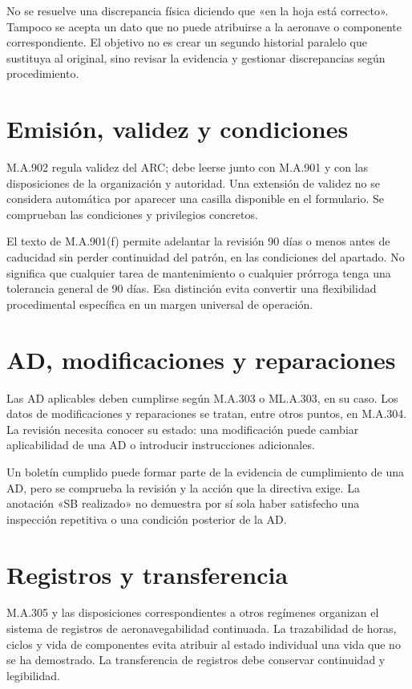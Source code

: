 No se resuelve una discrepancia física diciendo que «en la hoja está correcto». Tampoco se acepta un dato que no puede atribuirse a la aeronave o componente correspondiente. El objetivo no es crear un segundo historial paralelo que sustituya al original, sino revisar la evidencia y gestionar discrepancias según procedimiento.
\section{Emisión, validez y condiciones}
M.A.902 regula validez del ARC; debe leerse junto con M.A.901 y con las disposiciones de la organización y autoridad. Una extensión de validez no se considera automática por aparecer una casilla disponible en el formulario. Se comprueban las condiciones y privilegios concretos.

El texto de M.A.901(f) permite adelantar la revisión 90 días o menos antes de caducidad sin perder continuidad del patrón, en las condiciones del apartado. No significa que cualquier tarea de mantenimiento o cualquier prórroga tenga una tolerancia general de 90 días. Esa distinción evita convertir una flexibilidad procedimental específica en un margen universal de operación.
\section{AD, modificaciones y reparaciones}
Las AD aplicables deben cumplirse según M.A.303 o ML.A.303, en su caso. Los datos de modificaciones y reparaciones se tratan, entre otros puntos, en M.A.304. La revisión necesita conocer su estado: una modificación puede cambiar aplicabilidad de una AD o introducir instrucciones adicionales.

Un boletín cumplido puede formar parte de la evidencia de cumplimiento de una AD, pero se comprueba la revisión y la acción que la directiva exige. La anotación «SB realizado» no demuestra por sí sola haber satisfecho una inspección repetitiva o una condición posterior de la AD.
\section{Registros y transferencia}
M.A.305 y las disposiciones correspondientes a otros regímenes organizan el sistema de registros de aeronavegabilidad continuada. La trazabilidad de horas, ciclos y vida de componentes evita atribuir al estado individual una vida que no se ha demostrado. La transferencia de registros debe conservar continuidad y legibilidad.

